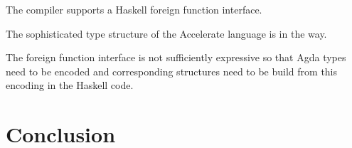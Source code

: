 \documentclass{llncs}
\begin{document}
The compiler supports a Haskell foreign function interface. 

The sophisticated type structure of the Accelerate language is in the
way.

The foreign function interface is not sufficiently expressive so that
Agda types need to be encoded and corresponding structures need to be
build from this encoding in the Haskell code. 

\section{Conclusion}
\label{sec:conclusion}


%
%


\end{document}
